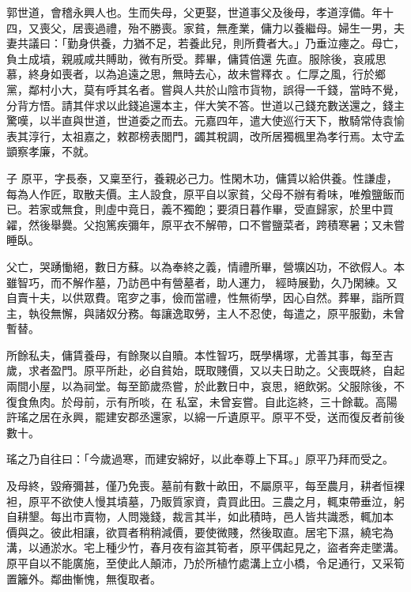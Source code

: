 \begin{pinyinscope}
 郭世道，會稽永興人也。生而失母，父更娶，世道事父及後母，孝道淳備。年十四，又喪父，居喪過禮，殆不勝喪。家貧，無產業，傭力以養繼母。婦生一男，夫妻共議曰：「勤身供養，力猶不足，若養此兒，則所費者大。」乃垂泣瘞之。母亡，負土成墳，親戚咸共賻助，微有所受。葬畢，傭賃倍還
 先直。服除後，哀戚思慕，終身如喪者，以為追遠之思，無時去心，故未嘗釋衣。仁厚之風，行於鄉黨，鄰村小大，莫有呼其名者。嘗與人共於山陰市貨物，誤得一千錢，當時不覺，分背方悟。請其伴求以此錢追還本主，伴大笑不答。世道以己錢充數送還之，錢主驚嘆，以半直與世道，世道委之而去。元嘉四年，遣大使巡行天下，散騎常侍袁愉表其淳行，太祖嘉之，敕郡榜表閭門，蠲其稅調，改所居獨楓里為孝行焉。太守孟顗察孝廉，不就。



 子
 原平，字長泰，又稟至行，養親必己力。性閑木功，傭賃以給供養。性謙虛，每為人作匠，取散夫價。主人設食，原平自以家貧，父母不辦有肴味，唯飧鹽飯而已。若家或無食，則虛中竟日，義不獨飽；要須日暮作畢，受直歸家，於里中買糴，然後舉爨。父抱篤疾彌年，原平衣不解帶，口不嘗鹽菜者，跨積寒暑；又未嘗睡臥。



 父亡，哭踴慟絕，數日方蘇。以為奉終之義，情禮所畢，營壙凶功，不欲假人。本雖智巧，而不解作墓，乃訪邑中有營墓者，助人運力，
 經時展勤，久乃閑練。又自賣十夫，以供眾費。窀穸之事，儉而當禮，性無術學，因心自然。葬畢，詣所買主，執役無懈，與諸奴分務。每讓逸取勞，主人不忍使，每遣之，原平服勤，未曾暫替。



 所餘私夫，傭賃養母，有餘聚以自贖。本性智巧，既學構塚，尤善其事，每至吉歲，求者盈門。原平所赴，必自貧始，既取賤價，又以夫日助之。父喪既終，自起兩間小屋，以為祠堂。每至節歲烝嘗，於此數日中，哀思，絕飲粥。父服除後，不復食魚肉。於母前，示有所啖，在
 私室，未曾妄嘗。自此迄終，三十餘載。高陽許瑤之居在永興，罷建安郡丞還家，以綿一斤遺原平。原平不受，送而復反者前後數十。



 瑤之乃自往曰：「今歲過寒，而建安綿好，以此奉尊上下耳。」原平乃拜而受之。



 及母終，毀瘠彌甚，僅乃免喪。墓前有數十畝田，不屬原平，每至農月，耕者恒裸袒，原平不欲使人慢其墳墓，乃販質家資，貴買此田。三農之月，輒束帶垂泣，躬自耕墾。每出市賣物，人問幾錢，裁言其半，如此積時，邑人皆共識悉，輒加本
 價與之。彼此相讓，欲買者稍稍減價，要使微賤，然後取直。居宅下濕，繞宅為溝，以通淤水。宅上種少竹，春月夜有盜其筍者，原平偶起見之，盜者奔走墜溝。原平自以不能廣施，至使此人顛沛，乃於所植竹處溝上立小橋，令足通行，又采筍置籬外。鄰曲慚愧，無復取者。




\end{pinyinscope}
